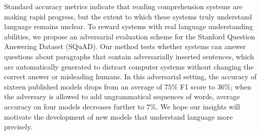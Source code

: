 Standard accuracy metrics indicate that reading comprehension systems are making rapid progress, but the extent to which these systems truly understand language remains unclear. To reward systems with real language understanding abilities, we propose an adversarial evaluation scheme for the Stanford Question Answering Dataset (SQuAD). Our method tests whether systems can answer questions about paragraphs that contain adversarially inserted sentences, which are automatically generated to distract computer systems without changing the correct answer or misleading humans. In this adversarial setting, the accuracy of sixteen published models drops from an average of $75\%$ F1 score to $36\%$; when the adversary is allowed to add ungrammatical sequences of words, average accuracy on four models decreases further to $7\%$. We hope our insights will motivate the development of new models that understand language more precisely.
